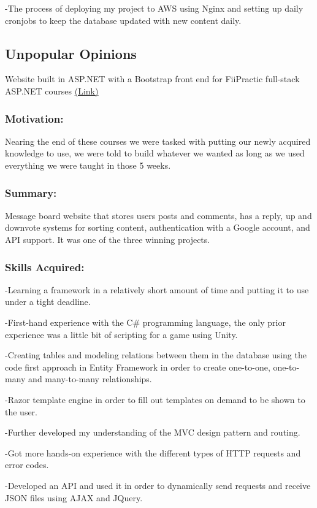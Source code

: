 \documentclass[a4paper,hidelinks,12pt]{article}
\begin{document}
-The process of deploying my project to AWS using Nginx and setting up daily cronjobs to keep the database updated with new
content daily.

\subsection{Unpopular Opinions}
Website built in ASP.NET with a Bootstrap front end for FiiPractic full-stack ASP.NET courses \href{https://github.com/IureaMarius/UnpopularOpinions}{(Link)}
\subsubsection{Motivation:}
Nearing the end of these courses we were tasked with putting our newly acquired knowledge to use, we were told
to build whatever we wanted as long as we used everything we were taught in those 5 weeks. 
\subsubsection{Summary:}
Message board website that stores users posts and comments, has a reply, up and downvote systems for sorting
content, authentication with a Google account, and API support. It was one of the three winning projects.
\subsubsection{Skills Acquired:}

-Learning a framework in a relatively short amount of time and putting it to use under a tight deadline.

-First-hand experience with the C\# programming language, the only prior experience was a little bit of 
scripting for a game using Unity.

-Creating tables and modeling relations between them in the database using the code first approach in Entity
Framework in order to create one-to-one, one-to-many and many-to-many relationships.

-Razor template engine in order to fill out templates on demand to be shown to the user.

-Further developed my understanding of the MVC design pattern and routing.

-Got more hands-on experience with the different types of HTTP requests and error codes.

-Developed an API and used it in order to dynamically send requests and receive JSON files using AJAX and JQuery.
\end{document}
